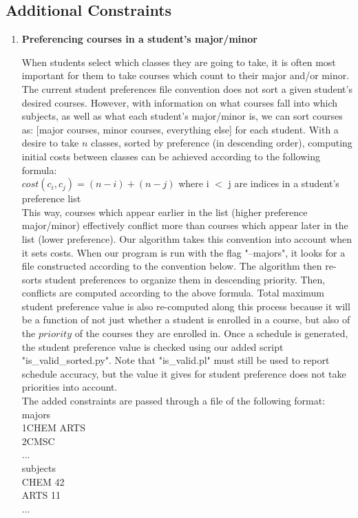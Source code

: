 \documentclass[11pt, oneside]{article}   	%
\begin{document}
\subsection{Additional Constraints}

\begin{enumerate}
\item{\textbf{Preferencing courses in a student's major/minor}}

When students select which classes they are going to take, it is often most important for them to take courses which count to their major and/or minor. The current student preferences file convention does not sort a given student's desired courses. However, with information on what courses fall into which subjects, as well as what each student's major/minor is, we can sort courses as: [major courses, minor courses, everything else] for each student. With a desire to take $n$ classes, sorted by preference (in descending order), computing initial costs between classes can be achieved according to the following formula:\\

$cost(c_i,c_j) = (n-i)+(n-j)$ where i $<$ j are indices in a student's preference list \\

This way, courses which appear earlier in the list (higher preference major/minor) effectively conflict more than courses which appear later in the list (lower preference). Our algorithm takes this convention into account when it sets costs. When our program is run with the flag "--majors", it looks for a file constructed according to the convention below. The algorithm then re-sorts student preferences to organize them in descending priority. Then, conflicts are computed according to the above formula. Total maximum student preference value is also re-computed along this process because it will be a function of not just whether a student is enrolled in a course, but also of the $priority$ of the courses they are enrolled in. Once a schedule is generated, the student preference value is checked using our added script "is\_valid\_sorted.py". Note that "is\_valid.pl" must still be used to report schedule accuracy, but the value it gives for student preference does not take priorities into account.\\

The added constraints are passed through a file of the following format:\\

majors\\
1\qquad CHEM ARTS\\
2\qquad CMSC \\
...\\
subjects\\
CHEM 42\\
ARTS 11\\
...\\


\end{enumerate}
\end{document}

